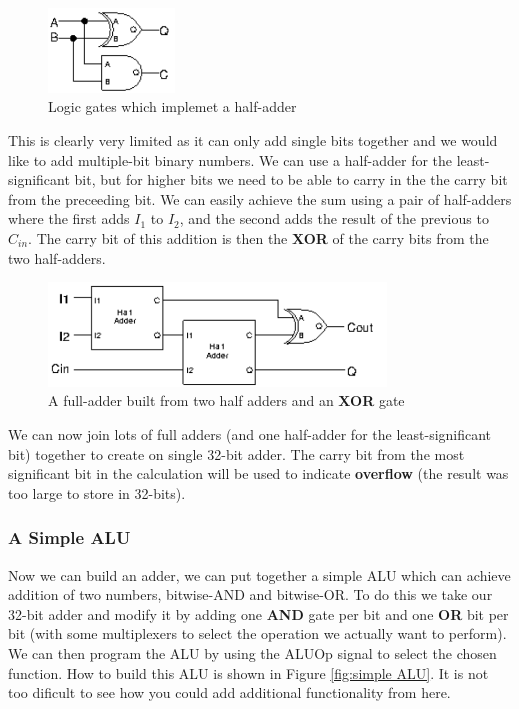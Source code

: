 \documentclass{article}
\begin{document}
	\begin{figure}[ht]
		\centering
		\includegraphics[width=0.3\textwidth]{single_bit_adder}
		\caption{Logic gates which implemet a half-adder}
		\label{fig:half adder}
	\end{figure}
	
	This is clearly very limited as it can only add single bits together and we would like to add multiple-bit binary numbers. We can use a half-adder for the least-significant bit, but for higher bits we need to be able to carry in the the carry bit from the preceeding bit. We can easily achieve the sum using a pair of half-adders where the first adds $I_{1}$ to $I_{2}$, and the second adds the result of the previous to $C_{in}$. The carry bit of this addition is then the \textbf{XOR} of the carry bits from the two half-adders.
	
	\begin{figure}[ht]
		\centering
		\includegraphics[width=0.8\textwidth]{full_adder}
		\caption{A full-adder built from two half adders and an \textbf{XOR} gate}
		\label{fig:full_adder}
	\end{figure}
	
	We can now join lots of full adders (and one half-adder for the least-significant bit) together to create on single 32-bit adder. The carry bit from the most significant bit in the calculation will be used to indicate \textbf{overflow} (the result was too large to store in 32-bits).
	
	\subsubsection{A Simple ALU}
	Now we can build an adder, we can put together a simple ALU which can achieve addition of two numbers, bitwise-AND and bitwise-OR. To do this we take our 32-bit adder and modify it by adding one \textbf{AND} gate per bit and one \textbf{OR} bit per bit (with some multiplexers to select the operation we actually want to perform). We can then program the ALU by using the ALUOp signal to select the chosen function. How to build this ALU is shown in Figure \ref{fig:simple ALU}. It is not too dificult to see how you could add additional functionality from here.
	
\end{document}
